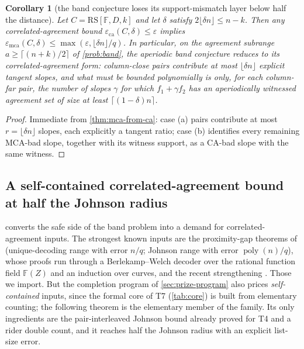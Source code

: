 \documentclass[11pt]{article}
\newtheorem{corollary}[theorem]{Corollary}
\theoremstyle{definition}
\theoremstyle{remark}
\newcommand{\F}{\mathbb{F}}
\newcommand{\RS}{\mathrm{RS}}
\newcommand{\eca}{\varepsilon_{\mathrm{ca}}}
\newcommand{\emca}{\varepsilon_{\mathrm{mca}}}
\begin{document}
\begin{corollary}[the band conjecture loses its support-mismatch layer below half the distance]\label{cor:band-reduction}
Let $C=\RS[\F,D,k]$ and let $\delta$ satisfy $2\lfloor\delta n\rfloor\le n-k$. Then any correlated-agreement bound $\eca(C,\delta)\le\varepsilon$ implies $\emca(C,\delta)\le\max(\varepsilon,\lfloor\delta n\rfloor/q)$. In particular, on the agreement subrange $a\ge\lceil(n+k)/2\rceil$ of \cref{prob:band}, the aperiodic band conjecture reduces to its correlated-agreement form: column-close pairs contribute at most $\lfloor\delta n\rfloor$ explicit tangent slopes, and what must be bounded polynomially is only, for each column-far pair, the number of slopes $\gamma$ for which $f_1+\gamma f_2$ has an aperiodically witnessed agreement set of size at least $\lceil(1-\delta)n\rceil$.
\end{corollary}

\begin{proof}
Immediate from \cref{thm:mca-from-ca}: case \textup{(a)} pairs contribute at most $r=\lfloor\delta n\rfloor$ slopes, each explicitly a tangent ratio; case \textup{(b)} identifies every remaining MCA-bad slope, together with its witness support, as a CA-bad slope with the same witness.
\end{proof}

\subsection{A self-contained correlated-agreement bound at half the Johnson radius}\label{sec:pincer-ca}

 converts the safe side of the band problem into a demand for correlated-agreement inputs. The strongest known inputs are the proximity-gap theorems of \cite{BCIKS20} (unique-decoding range with error $n/q$; Johnson range with error $\operatorname{poly}(n)/q$), whose proofs run through a Berlekamp--Welch decoder over the rational function field $\F(Z)$ and an induction over curves, and the recent strengthening \cite{BCHKS25}. Those we import. But the completion program of \cref{sec:prize-program} also prices \emph{self-contained} inputs, since the formal core of T7 (\cref{tab:core}) is built from elementary counting; the following theorem is the elementary member of the family. Its only ingredients are the pair-interleaved Johnson bound already proved for T4 and a rider double count, and it reaches half the Johnson radius with an explicit list-size error.
\end{document}
